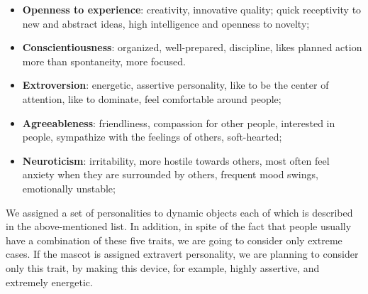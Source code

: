 \begin{itemize}
  \item  \textbf{Openness to experience}: creativity, innovative quality; quick receptivity to new and abstract ideas, high intelligence and openness to novelty;
  \item  \textbf{Conscientiousness}: organized, well-prepared, discipline, likes planned action more than spontaneity, more focused.
  \item  \textbf{Extroversion}: energetic, assertive personality, like to be the center of attention, like to dominate, feel comfortable around people;
  \item  \textbf{Agreeableness}: friendliness, compassion for other people, interested in people, sympathize with the feelings of others, soft-hearted;
  \item  \textbf{Neuroticism}:  irritability, more hostile towards others, most often feel anxiety when they are surrounded by others, frequent mood swings, emotionally unstable;
  \end{itemize}
  
\par We assigned a set of personalities to dynamic objects each of which is described in the above-mentioned list. In addition, in spite of the fact that people usually have a combination of these five traits, we are going to consider only extreme cases. If the mascot is assigned extravert personality, we are planning to consider only this trait, by making this device, for example, highly assertive, and extremely energetic.  


\clearpage
\begingroup
  \pagestyle{plain}
  
	\emph{}	
	\vfill
  \clearpage
\endgroup 
